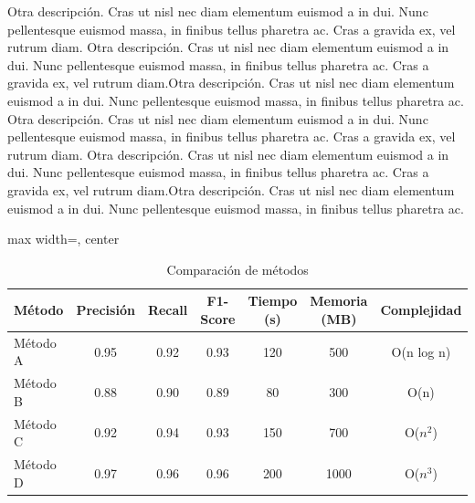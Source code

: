 \documentclass[b5paper, 10pt]{book}
\begin{document}
Otra descripción. Cras ut nisl nec diam elementum euismod a in dui. Nunc pellentesque euismod massa, in finibus tellus pharetra ac. Cras a gravida ex, vel rutrum diam. Otra descripción. Cras ut nisl nec diam elementum euismod a in dui. Nunc pellentesque euismod massa, in finibus tellus pharetra ac. Cras a gravida ex, vel rutrum diam.Otra descripción. Cras ut nisl nec diam elementum euismod a in dui. Nunc pellentesque euismod massa, in finibus tellus pharetra ac.
Otra descripción. Cras ut nisl nec diam elementum euismod a in dui. Nunc pellentesque euismod massa, in finibus tellus pharetra ac. Cras a gravida ex, vel rutrum diam. Otra descripción. Cras ut nisl nec diam elementum euismod a in dui. Nunc pellentesque euismod massa, in finibus tellus pharetra ac. Cras a gravida ex, vel rutrum diam.Otra descripción. Cras ut nisl nec diam elementum euismod a in dui. Nunc pellentesque euismod massa, in finibus tellus pharetra ac.

\begin{table}
	\centering
	\caption{Comparación de métodos}
	\begin{adjustbox}{max width=\textwidth, center}
		\begin{tabular}{lcccccc}
			\toprule
			Método & Precisión & Recall & F1-Score & Tiempo (s) & Memoria (MB) & Complejidad \\
			\midrule
			Método A & 0.95 & 0.92 & 0.93 & 120 & 500 & O(n log n) \\
			Método B & 0.88 & 0.90 & 0.89 & 80 & 300 & O(n) \\
			Método C & 0.92 & 0.94 & 0.93 & 150 & 700 & O($n^2$) \\
			Método D & 0.97 & 0.96 & 0.96 & 200 & 1000 & O($n^3$) \\
			\bottomrule
		\end{tabular}
	\end{adjustbox}
	\label{tab:comparacion}
\end{table}
\end{document}
